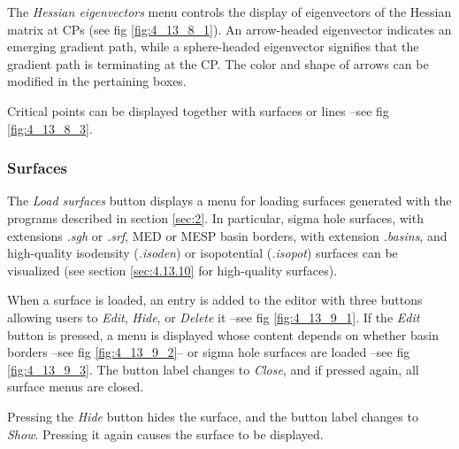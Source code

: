 \documentclass[10pt]{article}
\begin{document}
The {\it Hessian eigenvectors} menu controls the display of eigenvectors of 
the Hessian matrix at CPs (see fig \ref{fig:4_13_8_1}).
An arrow-headed eigenvector indicates an emerging gradient path, while a sphere-headed eigenvector signifies that 
the gradient path is terminating at the CP. The color and shape of arrows can be modified in the pertaining 
boxes.

Critical points can be displayed together with surfaces or lines --see fig \ref{fig:4_13_8_3}.


\subsubsection{Surfaces \label{sec:4.13.9}}

The {\it Load surfaces} button displays a menu for loading surfaces
generated with the programs described in section \ref{sec:2}. In particular, 
sigma hole surfaces, with extensions {\it .sgh} or
{\it .srf}, MED or MESP basin borders, with extension 
{\it .basins}, and high-quality isodensity ({\it .isoden}) 
or isopotential ({\it .isopot}) surfaces can be visualized 
(see section \ref{sec:4.13.10} for high-quality surfaces).

When a surface is loaded, an entry is added to the editor with three buttons allowing users to
{\it Edit}, {\it Hide}, or {\it Delete} it --see fig \ref{fig:4_13_9_1}. If the
{\it Edit} button is pressed, a menu is displayed whose content depends on whether basin borders
--see fig \ref{fig:4_13_9_2}-- or sigma hole surfaces are loaded --see fig \ref{fig:4_13_9_3}.
The button label changes to {\it Close}, and if pressed again, all surface menus are closed.

Pressing the {\it Hide} button hides the surface, and the button label changes to {\it Show}.
Pressing it again causes the surface to be displayed.
\end{document}
